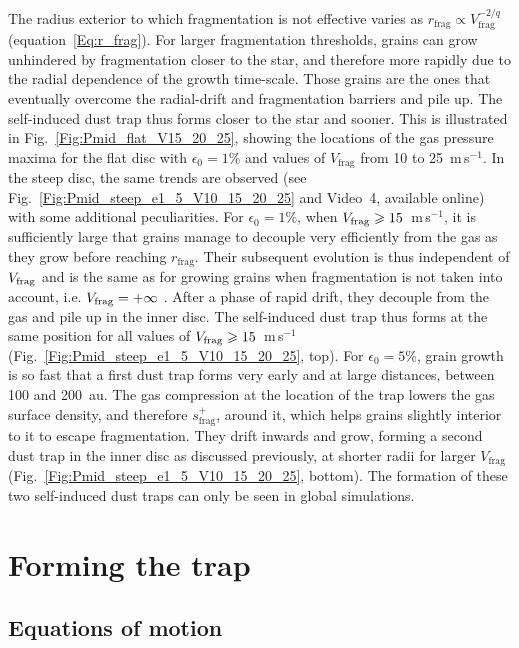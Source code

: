 \documentclass[a4paper,fleqn,usenatbib]{mnras}
\newcommand{\Vfrag}{V_\mathrm{frag}}  %
\begin{document}
The radius exterior to which fragmentation is not effective varies as $r_\mathrm{frag}\propto\Vfrag^{-2/q}$ (equation~\ref{Eq:r_frag}). For larger fragmentation thresholds, grains can grow unhindered by fragmentation closer to the star, and therefore more rapidly due to the radial dependence of the growth time-scale. Those grains are the ones that eventually overcome the radial-drift and fragmentation barriers and pile up. The self-induced dust trap thus forms closer to the star and sooner. This is illustrated in Fig.~\ref{Fig:Pmid_flat_V15_20_25}, showing the locations of the gas pressure maxima for the flat disc with $\epsilon_0=1\%$ and values of $\Vfrag$ from 10 to 25~m\,s$^{-1}$. In the steep disc, the same trends are observed (see Fig.~\ref{Fig:Pmid_steep_e1_5_V10_15_20_25} and Video~4, available online) with some additional peculiarities. For $\epsilon_0=1\%$, when $V_{\rm frag}\ge15$~m\,s$^{-1}$, it is sufficiently large that grains manage to decouple very efficiently from the gas as they grow before reaching $r_\mathrm{frag}$. Their subsequent evolution is thus independent of $V_{\rm frag}$ and is the same as for growing grains when fragmentation is not taken into account, i.e. $V_{\rm frag}=+\infty$ \citep{Laibe2008,Laibe2014}. After a phase of rapid drift, they decouple from the gas and pile up in the inner disc. The self-induced dust trap thus forms at the same position for all values of $V_{\rm frag}\ge15$~m\,s$^{-1}$ (Fig.~\ref{Fig:Pmid_steep_e1_5_V10_15_20_25}, top). For $\epsilon_0=5\%$, grain growth is so fast that a first dust trap forms very early and at large distances, between 100 and 200~au. The gas compression at the location of the trap lowers the gas surface density, and therefore $s_\mathrm{frag}^+$, around it, which helps grains slightly interior to it to escape fragmentation. They drift inwards and grow, forming a second dust trap in the inner disc as discussed previously, at shorter radii for larger $\Vfrag$ (Fig.~\ref{Fig:Pmid_steep_e1_5_V10_15_20_25}, bottom). The formation of these two self-induced dust traps can only be seen in global simulations.

\section{Forming the trap}
\label{app:GasDyn}

\subsection{Equations of motion}
\end{document}
